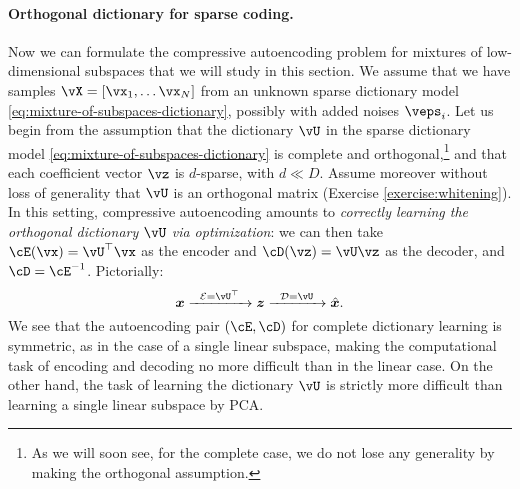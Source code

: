 \documentclass[\toplevelprefix/book-main.tex]{subfiles}
\begin{document}
\paragraph{Orthogonal dictionary for sparse coding.}
Now we can formulate the compressive autoencoding problem for mixtures of low-dimensional subspaces that we will study in this section.
We assume that we have samples $\vX = [\vx_1, \dots \vx_N]$ from an unknown sparse dictionary model \eqref{eq:mixture-of-subspaces-dictionary}, possibly with added noises $\veps_i$.
Let us begin from the assumption that the dictionary $\vU$ in the sparse dictionary model \eqref{eq:mixture-of-subspaces-dictionary} is complete and orthogonal,\footnote{As we will soon see, for the complete case, we do not lose any generality by making the orthogonal assumption.} and that each coefficient vector $\vz$ is $d$-sparse, with $d \ll D$.
Assume moreover without loss of generality that $\vU$ is an orthogonal matrix (Exercise \ref{exercise:whitening}).
In this setting, compressive autoencoding amounts to \textit{correctly learning the orthogonal dictionary $\vU$ via optimization}: we
can then take $\cE(\vx) = \vU^\top \vx$ as the encoder and $\cD(\vz) = \vU \vz$ as the decoder, and $\cD = \cE^{-1}$. Pictorially:
\begin{equation}
\x \xrightarrow{\hspace{2mm} \mathcal{E} = \vU^\top \hspace{2mm}}  \z \xrightarrow{\hspace{2mm} \mathcal{D} = \vU \hspace{2mm}}   \hat{\x}.  
\label{eqn:autoencoding-DL}
\end{equation}    
We see that the autoencoding pair $(\cE, \cD)$ for complete dictionary learning is symmetric, as in the case of a single linear subspace, making the computational task of encoding and decoding no more difficult than in the linear case. On the other hand, the task of learning the dictionary $\vU$ is strictly more difficult than learning a single linear subspace by PCA. 
\end{document}
